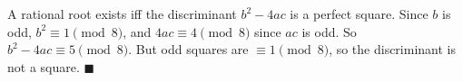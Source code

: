 A rational root exists iff the discriminant $b^2-4ac$ is a perfect square. Since $b$ is odd, $b^2\equiv1\pmod8$, and $4ac\equiv4\pmod8$ since $ac$ is odd. So $b^2-4ac\equiv5\pmod8$. But odd squares are $\equiv1\pmod8$, so the discriminant is not a square. $\blacksquare$
